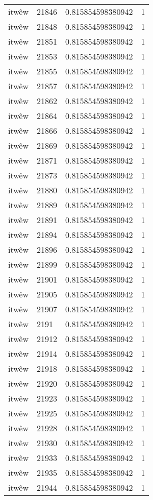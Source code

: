 \begin{longtable}{llll}
itwêw & 21846 & 0.815854598380942 & 1 \\
itwêw & 21848 & 0.815854598380942 & 1 \\
itwêw & 21851 & 0.815854598380942 & 1 \\
itwêw & 21853 & 0.815854598380942 & 1 \\
itwêw & 21855 & 0.815854598380942 & 1 \\
itwêw & 21857 & 0.815854598380942 & 1 \\
itwêw & 21862 & 0.815854598380942 & 1 \\
itwêw & 21864 & 0.815854598380942 & 1 \\
itwêw & 21866 & 0.815854598380942 & 1 \\
itwêw & 21869 & 0.815854598380942 & 1 \\
itwêw & 21871 & 0.815854598380942 & 1 \\
itwêw & 21873 & 0.815854598380942 & 1 \\
itwêw & 21880 & 0.815854598380942 & 1 \\
itwêw & 21889 & 0.815854598380942 & 1 \\
itwêw & 21891 & 0.815854598380942 & 1 \\
itwêw & 21894 & 0.815854598380942 & 1 \\
itwêw & 21896 & 0.815854598380942 & 1 \\
itwêw & 21899 & 0.815854598380942 & 1 \\
itwêw & 21901 & 0.815854598380942 & 1 \\
itwêw & 21905 & 0.815854598380942 & 1 \\
itwêw & 21907 & 0.815854598380942 & 1 \\
itwêw & 2191 & 0.815854598380942 & 1 \\
itwêw & 21912 & 0.815854598380942 & 1 \\
itwêw & 21914 & 0.815854598380942 & 1 \\
itwêw & 21918 & 0.815854598380942 & 1 \\
itwêw & 21920 & 0.815854598380942 & 1 \\
itwêw & 21923 & 0.815854598380942 & 1 \\
itwêw & 21925 & 0.815854598380942 & 1 \\
itwêw & 21928 & 0.815854598380942 & 1 \\
itwêw & 21930 & 0.815854598380942 & 1 \\
itwêw & 21933 & 0.815854598380942 & 1 \\
itwêw & 21935 & 0.815854598380942 & 1 \\
itwêw & 21944 & 0.815854598380942 & 1 \\

\end{longtable}
